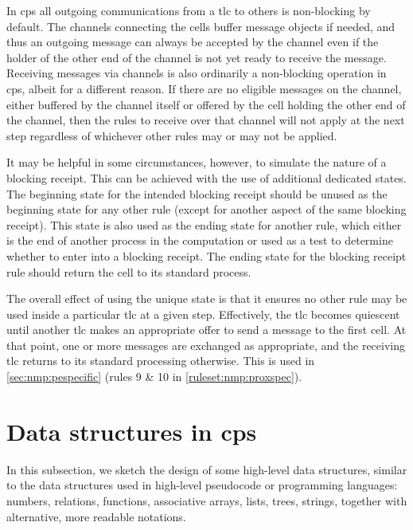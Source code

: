 In \gls{cps} all outgoing communications from a \gls{tlc} to others is non-blocking by default.  The channels connecting the cells buffer message objects if needed, and thus an outgoing message can always be accepted by the channel even if the holder of the other end of the channel is not yet ready to receive the message.  Receiving messages via channels is also ordinarily a non-blocking operation in \gls{cps}, albeit for a different reason.  If there are no eligible messages on the channel, either buffered by the channel itself or offered by the cell holding the other end of the channel, then the rules to receive over that channel will not apply at the next step regardless of whichever other rules may or may not be applied.

It may be helpful in some circumstances, however, to simulate the nature of a blocking receipt.  This can be achieved with the use of additional dedicated states.  The beginning state for the intended blocking receipt should be unused as the beginning state for any other rule (except for another aspect of the same blocking receipt).  This state is also used as the ending state for another rule, which either is the end of another process in the computation or used as a test to determine whether to enter into a blocking receipt.  The ending state for the blocking receipt rule should return the cell to its standard process.

The overall effect of using the unique state is that it ensures no other rule may be used inside a particular \gls{tlc} at a given step.  Effectively, the \gls{tlc} becomes quiescent until another \gls{tlc} makes an appropriate offer to send a message to the first cell.  At that point, one or more messages are exchanged as appropriate, and the receiving \gls{tlc} returns to its standard processing otherwise.  This is used in \cref{sec:nmp:pespecific} (rules 9 \& 10 in \cref{ruleset:nmp:proxspec}).


\section{Data structures in \texorpdfstring{\gls{cps}}{cP systems}}\label{sec-data-structures}

In this subsection, we sketch the design of some high-level data structures, 
similar to the data structures used in high-level pseudocode or %
programming languages:
numbers, relations, functions, associative arrays, lists, trees, strings, 
together with alternative, more readable notations.

